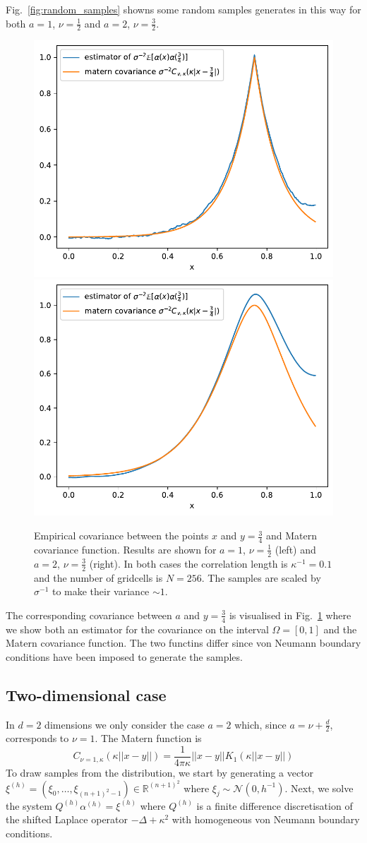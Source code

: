 \documentclass[11pt]{article}
\begin{document}
Fig.~\ref{fig:random_samples} showns some random samples generates in this way for both $a=1$, $\nu=\frac{1}{2}$ and $a=2$, $\nu=\frac{3}{2}$.
\begin{figure}
    \begin{center}
        \includegraphics[width=0.45\linewidth]{figures/covariance_nu0_5.pdf}
        \hfill
        \includegraphics[width=0.45\linewidth]{figures/covariance_nu1_5.pdf}
    \end{center}
    \caption{Empirical covariance between the points $x$ and $y=\frac{3}{4}$ and Matern covariance function. Results are shown for $a=1$, $\nu=\frac{1}{2}$ (left) and $a=2$, $\nu=\frac{3}{2}$ (right). In both cases the correlation length is $\kappa^{-1}=0.1$ and the number of gridcells is $N=256$. The samples are scaled by $\sigma^{-1}$ to make their variance $\sim 1$.}
    \label{fig:lognormal_covariance}
\end{figure}
The corresponding covariance between $a$ and $y=\frac{3}{4}$ is visualised in Fig.~\ref{fig:lognormal_covariance} where we show both an estimator for the covariance on the interval $\Omega=[0,1]$ and the Matern covariance function. The two functins differ since von Neumann boundary conditions have been imposed to generate the samples.
\subsection{Two-dimensional case}
In $d=2$ dimensions we only consider the case $a=2$ which, since $a=\nu+\frac{d}{2}$, corresponds to $\nu=1$. The Matern function is
\begin{equation}
    C_{\nu=1,\kappa}(\kappa||x-y||) = \frac{1}{4\pi\kappa} ||x-y|| K_1(\kappa||x-y||)
\end{equation}
To draw samples from the distribution, we start by generating a vector $\xi^{(h)}=(\xi_0,\dots,\xi_{(n+1)^2-1})\in\mathbb{R}^{(n+1)^2}$ where $\xi_j\sim\mathcal{N}(0,h^{-1})$. Next, we solve the system $Q^{(h)}\alpha^{(h)}=\xi^{(h)}$ where $Q^{(h)}$ is a finite difference discretisation of the shifted Laplace operator $-\Delta+\kappa^2$ with homogeneous von Neumann boundary conditions.


\end{document}
